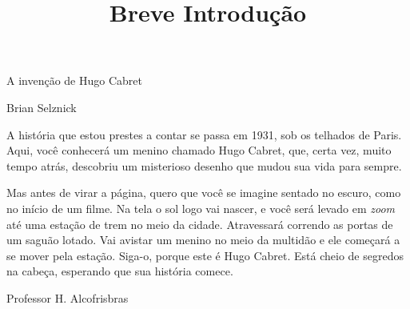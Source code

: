 \documentclass[12pt,article,a4paper,oneside]{memoir}
\begin{document}
\vspace*{\fill}
\begin{center}
{\Huge A invenção de Hugo Cabret}

\vspace*{\fill}

{\Large Brian Selznick}
\end{center}

\vspace*{\fill}


\title{\Huge Breve Introdução}
\date{}
\author{}
\maketitle 

\Large A história que estou prestes a contar se passa em 1931, sob os telhados de Paris. Aqui, você conhecerá um menino chamado Hugo Cabret, que, certa vez, muito tempo atrás, descobriu um misterioso desenho que mudou sua vida para sempre.

\smallskip

Mas antes de virar a página, quero que você se imagine sentado no escuro, como no início de um filme. Na tela o sol logo vai nascer, e você será levado em \emph{zoom} até uma estação de trem no meio da cidade. Atravessará correndo as portas de um saguão lotado. Vai avistar um menino no meio da multidão e ele começará a se mover pela estação. Siga-o, porque este é Hugo Cabret. Está cheio de segredos na cabeça, esperando que sua história comece.

\vspace{\fill}

\begin{flushright}
Professor H. Alcofrisbras
\end{flushright}
\end{document}
